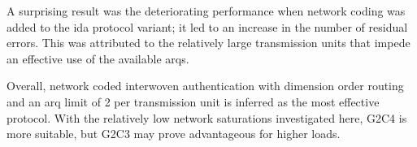 A surprising result was the deteriorating performance when network coding was added to the \gls{ida} protocol variant; it led to an increase in the
number of residual errors. This was attributed to the relatively large transmission units that impede an effective use of the available \glspl{arq}.

Overall, network coded interwoven authentication with dimension order routing and an \gls{arq} limit of 2 per transmission unit is inferred as the
most effective protocol. With the relatively low network saturations investigated here, G2C4 is more suitable, but G2C3 may prove advantageous for
higher loads.
